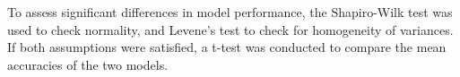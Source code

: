 To assess significant differences in model performance, the Shapiro-Wilk test was used to check normality, and Levene's test to check for homogeneity of variances. If both assumptions were satisfied, a t-test was conducted to compare the mean accuracies of the two models.